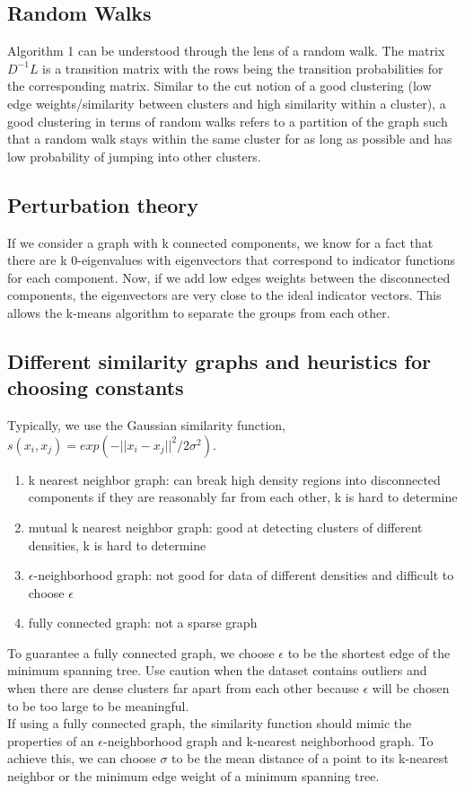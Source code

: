 \documentclass{article}
\begin{document}
\subsection{Random Walks}
Algorithm 1 can be understood through the lens of a random walk. The matrix $D^{-1}L$ is a transition matrix with the rows being the transition probabilities for the corresponding matrix. Similar to the cut notion of a good clustering (low edge weights/similarity between clusters and high similarity within a cluster), a good clustering in terms of random walks refers to a partition of the graph such that a random walk stays within the same cluster for as long as possible and has low probability of jumping into other clusters.

\subsection{Perturbation theory}
If we consider a graph with k connected components, we know for a fact that there are k 0-eigenvalues with eigenvectors that correspond to indicator functions for each component. Now, if we add low edges weights between the disconnected components, the eigenvectors are very close to the ideal indicator vectors. This allows the k-means algorithm to separate the groups from each other.

\subsection{Different similarity graphs and heuristics for choosing constants}
Typically, we use the Gaussian similarity function, $s(x_i, x_j) = exp(-||x_i - x_j||^2/2\sigma^2)$.
\begin{enumerate}
    \item k nearest neighbor graph: can break high density regions into disconnected components if they are reasonably far from each other, k is hard to determine
    \item mutual k nearest neighbor graph: good at detecting clusters of different densities, k is hard to determine
    \item $\epsilon$-neighborhood graph: not good for data of different densities and difficult to choose $\epsilon$
    \item fully connected graph: not a sparse graph
\end{enumerate}
To guarantee a fully connected graph, we choose $\epsilon$ to be the shortest edge of the minimum spanning tree. Use caution when the dataset contains outliers and when there are dense clusters far apart from each other because $\epsilon$ will be chosen to be too large to be meaningful. \\[1em]
If using a fully connected graph, the similarity function should mimic the properties of an $\epsilon$-neighborhood graph and k-nearest neighborhood graph. To achieve this, we can choose $\sigma$ to be the mean distance of a point to its k-nearest neighbor or the minimum edge weight of a minimum spanning tree. 
\end{document}
